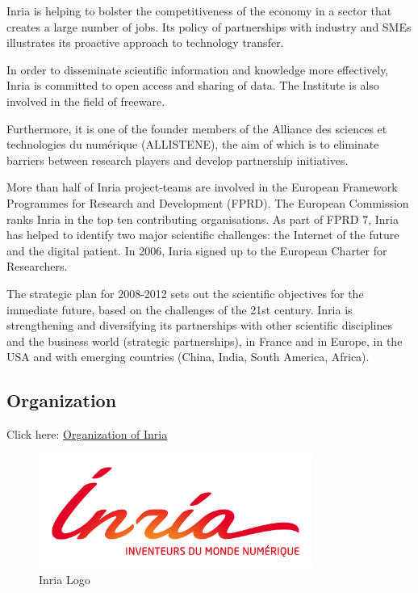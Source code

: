 Inria is helping to bolster the competitiveness of the economy in a sector that creates a large number of jobs. Its policy of partnerships with industry and SMEs illustrates its proactive approach to technology transfer.

In order to disseminate scientific information and knowledge more effectively, Inria is committed to open access and sharing of data. The Institute is also involved in the field of freeware.

Furthermore, it is one of the founder members of the Alliance des sciences et technologies du numérique (ALLISTENE), the aim of which is to eliminate barriers between research players and develop partnership initiatives.


More than half of Inria project-teams are involved in the European Framework Programmes for Research and Development (FPRD). The European Commission ranks Inria in the top ten contributing organisations. As part of FPRD 7, Inria has helped to identify two major scientific challenges: the Internet of the future and the digital patient. In 2006, Inria signed up to the European Charter for Researchers.


The strategic plan for 2008-2012 sets out the scientific objectives for the immediate future, based on the challenges of the 21st century. Inria is strengthening and diversifying its partnerships with other scientific disciplines and the business world (strategic partnerships), in France and in Europe, in the USA and with emerging countries (China, India, South America, Africa).

\subsection{Organization}

Click here: \href{http://www.inria.fr/en/institute/organisation}{Organization of Inria}

\begin{figure}[ht]
	\centering
	\includegraphics[width=0.8\textwidth]{Images/INRIA.jpg}
	\caption{Inria Logo\protect\footnotemark}
\end{figure} 




